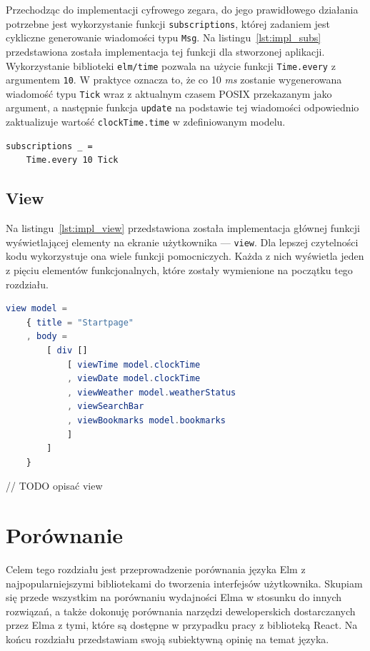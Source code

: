 \documentclass[twoside,a4paper]{report}
\begin{document}
Przechodząc do implementacji cyfrowego zegara, do jego prawidłowego działania potrzebne jest wykorzystanie funkcji \texttt{subscriptions}, której zadaniem jest cykliczne generowanie wiadomości typu \texttt{Msg}.
Na listingu~\ref{lst:impl_subs} przedstawiona została implementacja tej funkcji dla stworzonej aplikacji.
Wykorzystanie biblioteki \texttt{elm/time} pozwala na użycie funkcji \texttt{Time.every} z argumentem \texttt{10}.
W praktyce oznacza to, że co 10 \textit{ms} zostanie wygenerowana wiadomość typu \texttt{Tick} wraz z aktualnym czasem POSIX przekazanym jako argument, a następnie funkcja \texttt{update} na podstawie tej wiadomości odpowiednio zaktualizuje wartość \texttt{clockTime.time} w zdefiniowanym modelu.

\begin{lstlisting}[mathescape,caption={Implementacja funkcji \texttt{subscriptions}},label={lst:impl_subs}]
subscriptions _ =
    Time.every 10 Tick
\end{lstlisting}

\section{View}
Na listingu~\ref{lst:impl_view} przedstawiona została implementacja głównej funkcji wyświetlającej elementy na ekranie użytkownika --- \texttt{view}.
Dla lepszej czytelności kodu wykorzystuje ona wiele funkcji pomocniczych.
Każda z nich wyświetla jeden z pięciu elementów funkcjonalnych, które zostały wymienione na początku tego rozdziału.
\begin{lstlisting}[mathescape,caption={Implementacja funkcji \texttt{view}},label={lst:impl_view},language={Elm}]
view model =
    { title = "Startpage"
    , body =
        [ div []
            [ viewTime model.clockTime
            , viewDate model.clockTime
            , viewWeather model.weatherStatus
            , viewSearchBar
            , viewBookmarks model.bookmarks
            ]
        ]
    }
\end{lstlisting}

// TODO opisać view


\chapter{Porównanie}
Celem tego rozdziału jest przeprowadzenie porównania języka Elm z najpopularniejszymi bibliotekami do tworzenia interfejsów użytkownika.
Skupiam się przede wszystkim na porównaniu wydajności Elma w stosunku do innych rozwiązań, a także dokonuję porównania narzędzi deweloperskich dostarczanych przez Elma z tymi, które są dostępne w przypadku pracy z biblioteką React.
Na końcu rozdziału przedstawiam swoją subiektywną opinię na temat języka.
\end{document}

